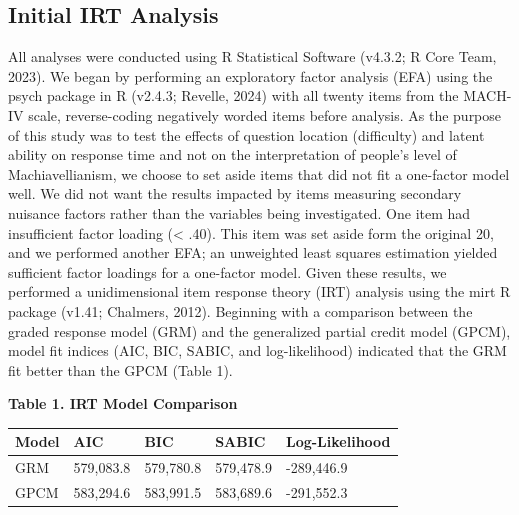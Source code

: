 \documentclass[
]{agujournal2019}
\begin{document}
\subsection{Initial IRT Analysis}\label{initial-irt-analysis}

All analyses were conducted using R Statistical Software (v4.3.2; R Core
Team, 2023). We began by performing an exploratory factor analysis (EFA)
using the psych package in R (v2.4.3; Revelle, 2024) with all twenty
items from the MACH-IV scale, reverse-coding negatively worded items
before analysis. As the purpose of this study was to test the effects of
question location (difficulty) and latent ability on response time and
not on the interpretation of people's level of Machiavellianism, we
choose to set aside items that did not fit a one-factor model well. We
did not want the results impacted by items measuring secondary nuisance
factors rather than the variables being investigated. One item had
insufficient factor loading (\textless{} .40). This item was set aside
form the original 20, and we performed another EFA; an unweighted least
squares estimation yielded sufficient factor loadings for a one-factor
model. Given these results, we performed a unidimensional item response
theory (IRT) analysis using the mirt R package (v1.41; Chalmers, 2012).
Beginning with a comparison between the graded response model (GRM) and
the generalized partial credit model (GPCM), model fit indices (AIC,
BIC, SABIC, and log-likelihood) indicated that the GRM fit better than
the GPCM (Table 1).

\begin{tcolorbox}[enhanced jigsaw, leftrule=.75mm, colframe=quarto-callout-note-color-frame, breakable, colback=white, left=2mm, toprule=.15mm, opacityback=0, arc=.35mm, bottomrule=.15mm, rightrule=.15mm]

\vspace{-3mm}\textbf{Table 1. IRT Model Comparison}\vspace{3mm}

\begin{longtable}[]{@{}lllll@{}}
\toprule\noalign{}
Model & AIC & BIC & SABIC & Log-Likelihood \\
\midrule\noalign{}
\endhead
\bottomrule\noalign{}
\endlastfoot
GRM & 579,083.8 & 579,780.8 & 579,478.9 & -289,446.9 \\
GPCM & 583,294.6 & 583,991.5 & 583,689.6 & -291,552.3 \\
\end{longtable}

\end{tcolorbox}
\end{document}
